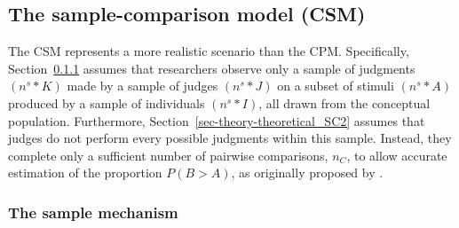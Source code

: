 \documentclass[
  authoryear,
  review,
  1p]{elsarticle}
\begin{document}
\subsection{The sample-comparison model
(CSM)}\label{sec-theory-theoretical_SC}

The CSM represents a more realistic scenario than the CPM. Specifically,
Section~\ref{sec-theory-theoretical_SC1} assumes that researchers
observe only a sample of judgments \((n^{s}*{K})\) made by a sample of
judges \((n^{s}*{J})\) on a subset of stimuli \((n^{s}*{A})\) produced
by a sample of individuals \((n^{s}*{I})\), all drawn from the
conceptual population. Furthermore,
Section~\ref{sec-theory-theoretical_SC2} assumes that judges do not
perform every possible judgments within this sample. Instead, they
complete only a sufficient number of pairwise comparisons, \(n_{C}\), to
allow accurate estimation of the proportion \(P(B > A)\), as originally
proposed by \citet{Thurstone_1927b}.

\subsubsection{The sample mechanism}\label{sec-theory-theoretical_SC1}
\end{document}
